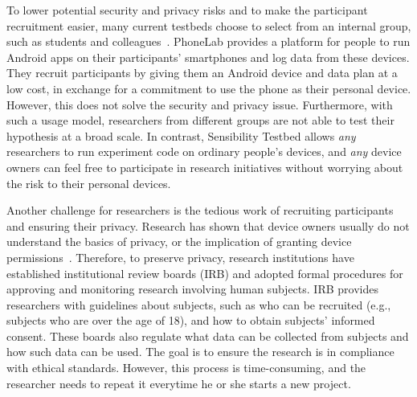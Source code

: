 To lower potential security and privacy risks and to make the 
participant recruitment easier, many current testbeds choose to 
select from an internal group, such as students and 
colleagues~\cite{hao2013isleep, wang2012no, 
wang2013sensing}. PhoneLab provides a platform for 
people to run Android apps on their participants' smartphones 
and log data from these devices. They recruit participants by 
giving them an Android device and data plan at a low cost, in 
exchange for a commitment to use the phone as their personal 
device. However, this does not solve the security and privacy issue. 
Furthermore, with such a usage model, researchers from different  
groups are not able to test their hypothesis at a broad scale.
In contrast, Sensibility Testbed 
allows \textit{any} researchers to run experiment code on ordinary people's 
devices, and \textit{any} device owners can feel free to 
participate in research initiatives without worrying about the risk 
to their personal devices.

Another challenge for researchers is the tedious work
of recruiting participants and ensuring their privacy. 
Research has shown that device owners usually do not understand the 
basics of privacy, or the implication of granting device 
permissions~\cite{camp2015respecting}. 
Therefore, to preserve privacy, research institutions have established 
institutional review boards (IRB) \cite{irb} and adopted formal 
procedures for approving and monitoring research involving 
human subjects. IRB provides researchers with guidelines about 
subjects, such as who can be recruited (e.g., subjects
who are over the age of 18), and 
how to obtain subjects' informed consent. These boards also 
regulate what data can be collected from subjects and how 
such data can be used. The goal is
to ensure the research is in compliance with ethical standards. 
However, this process is time-consuming, and the researcher needs 
to repeat it everytime he or she starts a new project. 


